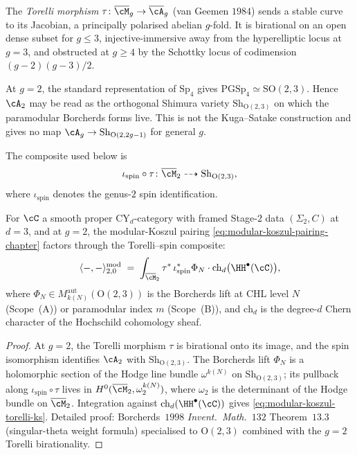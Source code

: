 \begin{definition}
\label{def:torelli-kuga-satake-chapter}
The \emph{Torelli morphism} $\tau \colon \overline{\cM}_g \to
\overline{\cA}_g$ (van Geemen $1984$) sends a stable curve to its
Jacobian, a principally polarised abelian $g$-fold. It is birational
on an open dense subset for $g \leq 3$, injective-immersive away from
the hyperelliptic locus at $g = 3$, and obstructed at $g \geq 4$ by
the Schottky locus of codimension $(g - 2)(g - 3)/2$.

At \(g=2\), the standard representation of \(\mathrm{Sp}_4\) gives
\(\mathrm{PGSp}_4\simeq \mathrm{SO}(2,3)\). Hence \(\cA_2\) may be read
as the orthogonal Shimura variety \(\mathrm{Sh}_{\mathrm O(2,3)}\) on
which the paramodular Borcherds forms live. This is not the
Kuga--Satake construction and gives no map \(\cA_g\to
\mathrm{Sh}_{\mathrm O(2,2g-1)}\) for general \(g\).

The composite used below is
\[
 \iota_{\mathrm{spin}}\circ\tau\colon \overline{\cM}_2
 \dashrightarrow \mathrm{Sh}_{\mathrm O(2,3)},
\]
where \(\iota_{\mathrm{spin}}\) denotes the genus-\(2\) spin
identification.
\end{definition}

\begin{proposition}
\label{prop:borcherds-pullback-torelli-ks}
For $\cC$ a smooth proper CY$_d$-category with framed Stage-$2$ data
$(\Sigma_2, C)$ at $d = 3$, and at $g = 2$, the modular-Koszul pairing
\eqref{eq:modular-koszul-pairing-chapter} factors through the
Torelli--spin composite:
\begin{equation}
\label{eq:modular-koszul-torelli-ks}
 \langle -, - \rangle^{\mathrm{mod}}_{2, 0} \;=\;
 \int_{\overline{\cM}_2} \tau^* \, \iota_{\mathrm{spin}}^* \Phi_N \cdot
 \mathrm{ch}_d\bigl(\HH^\bullet(\cC)\bigr),
\end{equation}
where $\Phi_N \in M^{\mathrm{aut}}_{k(N)}(\mathrm{O}(2, 3))$ is the
Borcherds lift at CHL level $N$ (Scope~(A)) or paramodular index $m$
(Scope~(B)), and $\mathrm{ch}_d$ is the degree-$d$ Chern character of
the Hochschild cohomology sheaf.
\end{proposition}

\begin{proof}
At $g = 2$, the Torelli morphism $\tau$ is birational onto its image,
and the spin isomorphism identifies \(\cA_2\) with
\(\mathrm{Sh}_{\mathrm{O}(2,3)}\). The Borcherds lift $\Phi_N$ is a
holomorphic section of the Hodge line bundle $\omega^{k(N)}$ on
$\mathrm{Sh}_{\mathrm{O}(2,3)}$; its pullback along
\(\iota_{\mathrm{spin}}\circ\tau\) lives in
$H^0(\overline{\cM}_2, \omega_2^{k(N)})$, where
$\omega_2$ is the determinant of the Hodge bundle on
$\overline{\cM}_2$. Integration against $\mathrm{ch}_d(\HH^\bullet(\cC))$
gives \eqref{eq:modular-koszul-torelli-ks}. Detailed proof:
Borcherds~$1998$ \emph{Invent.~Math.}\ $132$ Theorem~$13.3$
(singular-theta weight formula) specialised to $\mathrm{O}(2, 3)$
combined with the $g = 2$ Torelli birationality.
\end{proof}

